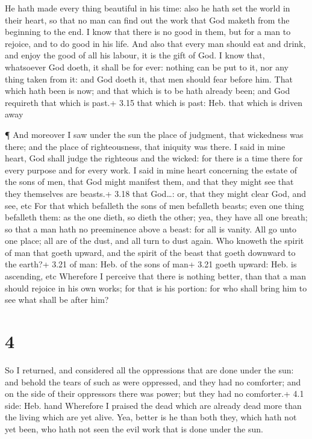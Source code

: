  He hath made every thing beautiful in his time: also he
hath set the world in their heart, so that no man can find out the work
that God maketh from the beginning to the end.  I know that
there is no good in them, but for a man to rejoice, and to do good in
his life.  And also that every man should eat and drink,
and enjoy the good of all his labour, it is the gift of God.
 I know that, whatsoever God doeth, it shall be for ever:
nothing can be put to it, nor any thing taken from it: and God doeth it,
that men should fear before him.  That which hath been is
now; and that which is to be hath already been; and God requireth that
which is past.+ 3.15 that which is past: Heb. that which is driven away

 ¶ And moreover I saw under the sun the place of judgment,
that wickedness was there; and the place of righteousness, that iniquity
was there.  I said in mine heart, God shall judge the
righteous and the wicked: for there is a time there for every purpose
and for every work.  I said in mine heart concerning the
estate of the sons of men, that God might manifest them, and that they
might see that they themselves are beasts.+ 3.18 that God\ldots: or,
that they might clear God, and see, etc  For that which
befalleth the sons of men befalleth beasts; even one thing befalleth
them: as the one dieth, so dieth the other; yea, they have all one
breath; so that a man hath no preeminence above a beast: for all is
vanity.  All go unto one place; all are of the dust, and
all turn to dust again.  Who knoweth the spirit of man that
goeth upward, and the spirit of the beast that goeth downward to the
earth?+ 3.21 of man: Heb. of the sons of man+ 3.21 goeth upward: Heb. is
ascending, etc  Wherefore I perceive that there is nothing
better, than that a man should rejoice in his own works; for that is his
portion: for who shall bring him to see what shall be after him?

\hypertarget{section-3}{%
\section{4}\label{section-3}}

 So I returned, and considered all the oppressions that are
done under the sun: and behold the tears of such as were oppressed, and
they had no comforter; and on the side of their oppressors there was
power; but they had no comforter.+ 4.1 side: Heb. hand 
Wherefore I praised the dead which are already dead more than the living
which are yet alive.  Yea, better is he than both they,
which hath not yet been, who hath not seen the evil work that is done
under the sun.

